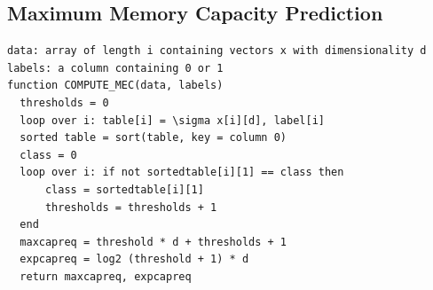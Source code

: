 \documentclass[12pt]{article}
\numberwithin{figure}{section} %
\begin{document}
\subsection{Maximum Memory Capacity Prediction}
\label{subsection:Maximum Memory Capacity Prediction}
\begin{lstlisting}
data: array of length i containing vectors x with dimensionality d 
labels: a column containing 0 or 1
function COMPUTE_MEC(data, labels)
  thresholds = 0
  loop over i: table[i] = \sigma x[i][d], label[i]
  sorted table = sort(table, key = column 0) 
  class = 0
  loop over i: if not sortedtable[i][1] == class then 
      class = sortedtable[i][1]
      thresholds = thresholds + 1
  end
  maxcapreq = threshold * d + thresholds + 1
  expcapreq = log2 (threshold + 1) * d
  return maxcapreq, expcapreq
\end{lstlisting}
\end{document}
